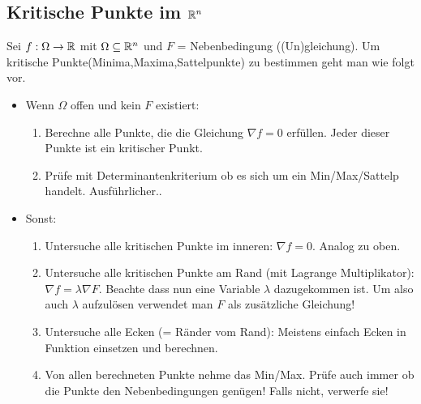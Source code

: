 \subsection{Kritische Punkte im $\mathbb{R}^n$}
Sei $f: \Omega \to \mathbb{R}$ mit $\Omega \subseteq \mathbb{R}^n$ und $F$ = Nebenbedingung ((Un)gleichung).
Um kritische Punkte(Minima,Maxima,Sattelpunkte) zu bestimmen geht man wie folgt vor. 
\begin{itemize}
	\item Wenn $\Omega$ offen und kein $F$ existiert:
	\begin{enumerate}
		\item Berechne alle Punkte, die die Gleichung $\nabla f = 0$ erfüllen. Jeder dieser Punkte ist ein kritischer Punkt.

		\item  \todo Prüfe mit Determinantenkriterium ob es sich um ein Min/Max/Sattelp handelt. Ausführlicher..
	\end{enumerate}

	\item Sonst:
	\begin{enumerate}
		\item Untersuche alle kritischen Punkte im inneren: $\nabla f = 0$. Analog zu oben.

		\item Untersuche alle kritischen Punkte am Rand (mit Lagrange Multiplikator): $\nabla f = \lambda \nabla F$. Beachte dass nun eine Variable $\lambda$ dazugekommen ist. Um also auch $\lambda$ aufzulösen verwendet man $F$ als zusätzliche Gleichung!

		\item Untersuche alle Ecken (= Ränder vom Rand): Meistens einfach Ecken in Funktion einsetzen und berechnen.

		\item Von allen berechneten Punkte nehme das Min/Max. Prüfe auch immer ob die Punkte den Nebenbedingungen genügen! Falls nicht, verwerfe sie!
	\end{enumerate}
\end{itemize}